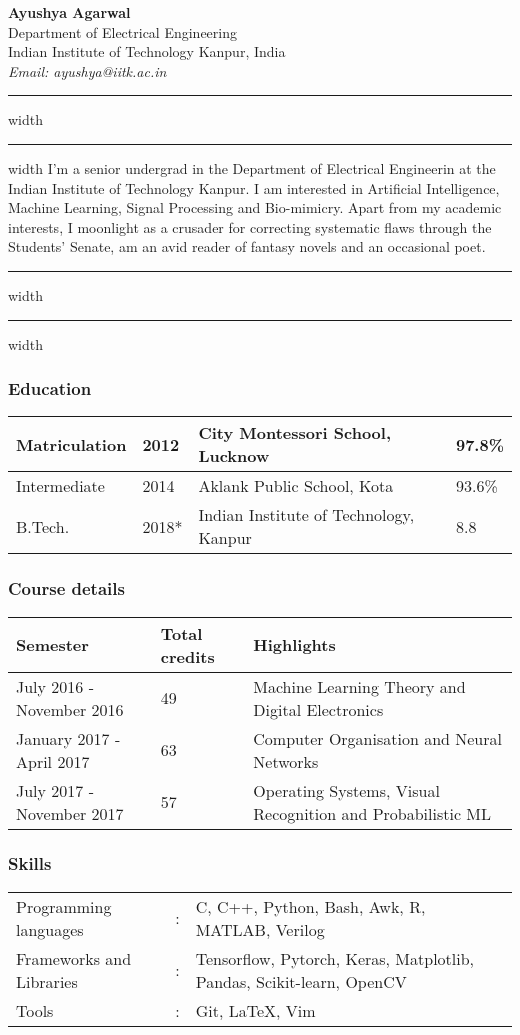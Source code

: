 \documentclass{article}
\begin{document}
\noindent
\textbf{Ayushya Agarwal}\\
Department of Electrical Engineering\\
Indian Institute of Technology Kanpur, India\\
\textit{Email: ayushya@iitk.ac.in}\\

\hrule width \hsize \kern 1mm \hrule width \hsize 
\vspace{2mm}
I'm a senior undergrad in the Department of Electrical Engineerin at the Indian Institute of Technology Kanpur. I am interested in Artificial Intelligence, Machine Learning, Signal Processing and Bio-mimicry. Apart from my academic interests, I moonlight as a crusader for correcting systematic flaws through the Students' Senate, am an avid reader of fantasy novels and an occasional poet.
\vspace{2.5mm}
\hrule width \hsize \kern 1mm \hrule width \hsize

\subsubsection*{Education}

\begin{tabular}{|l|l|l|l|}
\hline
Matriculation & 2012  & City Montessori School, Lucknow        & 97.8\% \\ \hline
Intermediate  & 2014  & Aklank Public School, Kota             & 93.6\% \\ \hline
B.Tech.       & 2018* & Indian Institute of Technology, Kanpur & 8.8    \\ \hline
\end{tabular}
\subsubsection*{Course details}
\begin{tabular}{ |l | l | l |  }
    \hline
    \textbf{Semester} & \textbf{Total credits} & \textbf{Highlights}\\
    \hline
    July 2016 - November 2016 & 49 & Machine Learning Theory and Digital Electronics \\
    \hline
    January 2017 - April 2017 & 63 & Computer Organisation and Neural Networks\\
    \hline
    July 2017 - November 2017 & 57 & Operating Systems, Visual Recognition and Probabilistic ML\\
    \hline
\end{tabular}
\subsubsection*{Skills}
\begin{tabular}{ l  l  l   }
    Programming languages & : & C, C++, Python, Bash, Awk, R, MATLAB, Verilog \\
    Frameworks and Libraries & : & Tensorflow, Pytorch, Keras, Matplotlib, Pandas, Scikit-learn, OpenCV \\
    Tools & : & Git, \LaTeX, Vim \\
\end{tabular}
\end{document}
